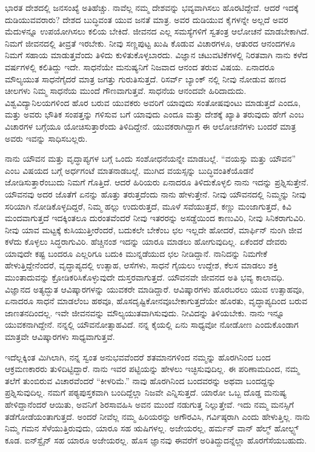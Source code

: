ಭಾರತ ದೇಶದಲ್ಲಿ ಜನಸಂಖ್ಯೆ ಅತಿಹೆಚ್ಚು. ನಾವೆಲ್ಲ ನಮ್ಮ ದೇಶವನ್ನು ಭವ್ಯವಾಗಿಸಲು ಹೊರಟಿದ್ದೇವೆ. ಆದರೆ ಇದಕ್ಕೆ ದುಡಿಯುವವರಾರು? ದೇಶದ ಬುದ್ಧಿವಂತ ಯುವ ಜನತೆ ಮಾತ್ರ. ಅವರ ದುಡಿಯುವ ಕೈಗಳನ್ನೇ ಅಲ್ಲದೆ ಅವರ ಮೆದುಳನ್ನೂ ಉಪಯೋಗಿಸಲು ಕಲಿಯ ಬೇಕಿದೆ. ಜೀವನದ ಎಲ್ಲ ಸಮಸ್ಯೆಗಳಿಗೆ ಸ್ವತಂತ್ರ ಆಲೋಚನೆ ಮಾಡಬೇಕಾಗಿದೆ. ನಿಮಗೆ ಜೀವನದಲ್ಲಿ ತೀವ್ರತೆ ಇರಬೇಕು. ನೀವು ಸಣ್ಣಪುಟ್ಟ ಖುಷಿ ಕೊಡುವ ವಿಚಾರಗಳೂ, ಆತುರದ ಆನಂದಗಳೂ ನಿಮಗೆ ಸಹಾಯ ಮಾಡುತ್ತವೆಂದು ತಿಳಿದು ಕುಳಿತುಕೊಳ್ಳಬಾರದು. ವಿಜ್ಞಾನ ಚಟುವಟಿಕೆಗಳಲ್ಲಿ ನಿರತವಾಗಿ ನಾನು ಕಳೆದ  ವರ್ಷಗಳಲ್ಲಿ ಕಲಿತಿದ್ದು ಇದೇ. ಸಾಧನೆಯೇ ಮನುಷ್ಯನಿಗೆ ನಿಜವಾದ ಆನಂದ ತರುವ ವಿಷಯ. ಏನಾದರೂ ಮೌಲ್ಯಯುತ ಸಾಧನೆಗೈದರೆ ಮಾತ್ರ ಜಗತ್ತು ಗುರುತಿಸುತ್ತದೆ. ರಿಸರ್ವ್ ಬ್ಯಾಂಕ್ ನಲ್ಲಿ ನೀವು ನೋಡುವ ಹಣದ ಚೀಲಗಳು ನಿಮ್ಮ ಸಾಧನೆಯ ಮುಂದೆ ಗೌಣವಾಗುತ್ತವೆ. ಸಾಧನೆಯ ಆನಂದವೇ ಹಿರಿದಾದುದು. ವಿಶ್ವವಿದ್ಯಾನಿಲಯಗಳಿಂದ ಹೊರ ಬರುವ ಯುವಕರು ಅವರಿಗೆ ಯಾವುದು ಸಂತೋಷವುಂಟು ಮಾಡುತ್ತದೆ ಎಂದೂ, ಮತ್ತು ಅವರು ಭೌತಿಕ ಸಂಪತ್ತನ್ನು ಗಳಿಸುವ ಬಗೆ ಯಾವುದು ಎಂದೂ ಮತ್ತು ದೇಶಕ್ಕೆ ಖ್ಯಾತಿ ತರುವುದು ಹೇಗೆ ಎಂಬ ವಿಚಾರಗಳ ಬಗ್ಗೆಯೂ ಯೋಚಿಸುತ್ತಾರೆಂದು ತಿಳಿದಿದ್ದೇನೆ. ಯುವಕರಾಗಿದ್ದಾಗ ಈ ಆಲೋಚನೆಗಳು ಬಂದರೆ ಮಾತ್ರ ಅವರು ಇವನ್ನು ಸಾಧಿಸಬಲ್ಲರು.

ನಾನು ಯೌವನ ಮತ್ತು ವೃದ್ಧಾಪ್ಯಗಳ ಬಗ್ಗೆ ಒಂದು ಸಂಶೋಧನೆಯನ್ನೇ ಮಾಡಬಲ್ಲೆ. “ವಯಸ್ಸು ಮತ್ತು ಯೌವನ” ಎಂಬ ವಿಷಯದ ಬಗ್ಗೆ ಅರ್ಧಗಂಟೆ ಮಾತನಾಡಬಲ್ಲೆ. ಮುಗಿದ ವಯಸ್ಸನ್ನು ಬುದ್ಧಿವಂತಿಕೆಯೊಡನೆ ಜೋಡಿಸುತ್ತಾರೆಂಬುದು ನಿಮಗೆ ಗೊತ್ತಿದೆ. ಆದರೆ ಹಿರಿಯರು ಏನಾದರೂ ತಿಳಿದುಕೊಳ್ಳಲಿ ನಾನು ಇದನ್ನು ಪ್ರಶ್ನಿಸುತ್ತೇನೆ. ಯೌವನವು ಅದರ ಜೊತೆಗೆ ಏನನ್ನು ಹೊತ್ತು ತರುತ್ತದೆಂದು ನಾನು ಹೇಳುತ್ತೇನೆ. ನೀವು ಯೌವನದಲ್ಲಿ ನಿಮ್ಮನ್ನು ನೀವು ಸರಿಯಾಗಿ ನೋಡಿಕೊಳ್ಳದಿದ್ದರೆ, ನಿಮ್ಮ ಹಲ್ಲು ಉದುರುತ್ತದೆ, ಮೂಳೆ ಸವೆಯುತ್ತದೆ, ಕಣ್ಣು ಮಂಜಾಗುತ್ತದೆ, ಕಿವಿ ಮಂದವಾಗುತ್ತದೆ ಇದಕ್ಕಿಂತಲೂ ದುರಂತವೆಂದರೆ ನೀವು ಇತರರನ್ನು ಅಸಡ್ಡೆಯಿಂದ ಕಾಣುವಿರಿ, ನೀವು ಸಿನಿಕರಾಗುವಿರಿ. ನೀವು ಯಾವ ಮಟ್ಟಕ್ಕೆ ಕುಸಿಯುತ್ತೀರೆಂದರೆ, ಬದುಕಲೇ ಬೇಕೆಂಬ ಛಲ ಇಲ್ಲದೇ ಹೋದರೆ, ಮಾರ್ಫಿನ್ ನುಂಗಿ ಜೀವ ಕಳೆದು ಕೊಳ್ಳಲು ಸಿದ್ಧರಾಗುವಿರಿ. ಹೆಚ್ಚಿನಂಶ ಇದನ್ನು ಯಾರೂ ಮಾಡಲು ಹೋಗುವುದಿಲ್ಲ. ಏಕೆಂದರೆ ದೇವರು ಯಾವುದೇ ಕಷ್ಟ ಬಂದರೂ ಎಲ್ಲರಿಗೂ ಬದುಕಿ ಮುನ್ನಡೆಯುದ ಛಲ ನೀಡಿದ್ದಾನೆ. ನಾನಿದನ್ನು ನಿಮಗೇಕೆ ಹೇಳುತ್ತಿದ್ದೇನೆಂದರೆ, ವೃದ್ಧಾಪ್ಯದಲ್ಲಿ ಉತ್ಸಾಹ, ಆಸೆಗಳು, ಸಾಧನೆ ಗೈಯಲು ಉದ್ದೇಶ, ಕೆಲಸ ಮಾಡಲು ಶಕ್ತಿ ಮುಂತಾದುವನ್ನು ಕ್ರೋಡಿಕರಿಸಿಕೊಳ್ಳುವುದೇ ದುಸ್ತರವಾಗುತ್ತದೆ. ಯೌವನವೇ ಜೀವನದ ಅತಿ ಭವ್ಯ ಕಾಲಾವಧಿ. ವಿಜ್ಞಾನದ ಅತ್ಯದ್ಭುತ ಆವಿಷ್ಕಾರಗಳನ್ನು ಯುವಕರೇ ಮಾಡಿದ್ದಾರೆ. ಆವಿಷ್ಕಾರಗಳು ಹೊರಬರಲು ಯುವ ಉತ್ಸಾಹವೂ, ಏನಾದರೂ ಸಾಧನೆ ಮಾಡಲೆಂಬ ಹಠವೂ, ಹೊಸದೃಷ್ಟಿಕೋನವೂ\break ಬೇಕಾಗುತ್ತದೆಯೇ ಹೊರತು, ವೃದ್ಧಾಪ್ಯದಿಂದ ಬರುವ ಜಾಣತನದಿಂದಲ್ಲ. ಇವೇ ಜೀವನವನ್ನು ಮೌಲ್ಯಯುತವಾಗಿಸುವುದು. ನೀವಿದನ್ನು ತಿಳಿಯಬೇಕು. ನಾನು ಇನ್ನೂ ಯುವಕನಾಗಿದ್ದೇನೆ. ನನ್ನಲ್ಲಿ ಯೌವನೋತ್ಸಾಹವಿದೆ. ನನ್ನ ಕೈಯಲ್ಲಿ ಏನು ಸಾಧ್ಯವೋ ನೋಡೋಣ ಎಂದುಕೊಂಡಾಗ ಮಾತ್ರವೇ ಆವಿಷ್ಕಾರಗಳು ಸಾಧ್ಯವಾಗುತ್ತವೆ.



ಇದೆಲ್ಲಕ್ಕಿಂತ ಮಿಗಿಲಾಗಿ, ನನ್ನ ಸ್ವಂತ ಅನುಭವವೆಂದರೆ ಶತಮಾನಗಳಿಂದ ನಮ್ಮನ್ನು ಹೊರಗಿನಿಂದ ಬಂದ ಆಕ್ರಮಣಕಾರರು ತುಳಿದಿಟ್ಟಿದ್ದಾರೆ. ನಾನು ಇವರ ಪಟ್ಟಿಯನ್ನು ಹೇಳಲು ಇಚ್ಛಿಸುವುದಿಲ್ಲ. ಈ ಪರಿಣಾಮದಿಂದ, ನಮ್ಮ ತಲೆಗೆ ತುಂಬಿರುವ ವಿಚಾರವೆಂದರೆ “ಕೀಳರಿಮೆ.” ನಾವು ಹೊರಗಿನಿಂದ ಬಂದವರನ್ನು ಅಥವಾ ಬಂದದ್ದನ್ನು ಪ್ರಶ್ನಿಸುವುದಿಲ್ಲ. ನಮಗೆ ಪಠ್ಯಪುಸ್ತಕವಾಗಿ ಬಂದಿದ್ದೆಲ್ಲಾ ನಿಜವೇ ಎನ್ನಿಸುತ್ತದೆ. ಯಾರೋ ಒಬ್ಬ ದೊಡ್ಡ ಮನುಷ್ಯ ಹೇಳಿದ್ದಾನೆಂದರೆ ಆಯಿತು, ಅವನಿಗೆ ಶಿರಸಾವಹಿಸಿ ಅವನ ಮುಂದೆ ನಡುಗುತ್ತ ನಿಲ್ಲುತ್ತೇವೆ. ಇದು ನಮ್ಮ ಮನಸ್ಸಿಗೆ ತಡೆಗೋಡೆಯಂತಾಗುತ್ತದೆ. ಅಂದರೆ ನೀವೆಲ್ಲ ನಮ್ಮ ಹಿರಿಯರನ್ನು ಅಗೌರವಿಸಿ, ಗರ್ವಿಷ್ಠರಾಗಿ ಎಂದು ಹೇಳುತ್ತಿಲ್ಲ. ನಾನು ನಿಮ್ಮ ಗಮನ ಸೆಳೆಯುತ್ತಿರುವುದು, ಯಾರೂ ಸಹ ಋಷಿಗಳಲ್ಲ. ಅಜೇಯರಲ್ಲ, ಹರ್ಮನ್ ವಾನ್ ಹೆಲ್ಮ್ ‍ಹೋಲ್ಟ್ಸ್ ಕೂಡ. ಐನ್‍ಸ್ಟೈನ್ ಸಹ ಯಾರೂ ಅಜೇಯರಲ್ಲ. ಹೊಸ ಜ್ಞಾನವು ಈವರೆಗೆ ಅರಿತಿದ್ದುದನ್ನೆಲ್ಲಾ ಹೊರಗೆಸೆಯಬಹುದು.

